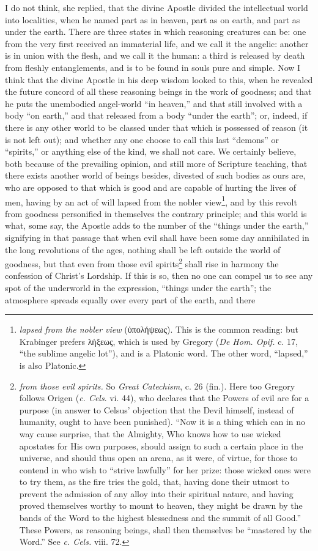 I do not think, she replied, that the divine Apostle divided the intellectual world into localities, when he named part as in heaven, part as on earth, and part as under the earth. There are three states in which reasoning creatures can be: one from the very first received an immaterial life, and we call it the angelic: another is in union with the flesh, and we call it the human: a third is released by death from fleshly entanglements, and is to be found in souls pure and simple. Now I think that the divine Apostle in his deep wisdom looked to this, when he revealed the future concord of all these reasoning beings in the work of goodness; and that he puts the unembodied angel-world “in heaven,” and that still involved with a body “on earth,” and that released from a body “under the earth”; or, indeed, if there is any other world to be classed under that which is possessed of reason (it is not left out); and whether any one choose to call this last “demons” or “spirits,” or anything else of the kind, we shall not care. We certainly believe, both because of the prevailing opinion, and still more of Scripture teaching, that there exists another world of beings besides, divested of such bodies as ours are, who are opposed to that which is good and are capable of hurting the lives of men, having by an act of will lapsed from the nobler view\footnote{\emph{lapsed from the nobler view} (\textgreek{ὑπολήψεως}). This is the common reading: but Krabinger prefers \textgreek{λήξεως}, which is used by Gregory (\emph{De Hom. Opif.} c. 17, “the sublime angelic lot”), and is a Platonic word. The other word, “lapsed,” is also Platonic.}, and by this revolt from goodness personified in themselves the contrary principle; and this world is what, some say, the Apostle adds to the number of the “things under the earth,” signifying in that passage that when evil shall have been some day annihilated in the long revolutions of the ages, nothing shall be left outside the world of goodness, but that even from those evil spirits\footnote{\emph{from those evil spirits.} So \emph{Great Catechism}, c. 26 (fin.). Here too Gregory follows Origen (\emph{c. Cels}. vi. 44), who declares that the Powers of evil are for a purpose (in answer to Celsus’ objection that the Devil himself, instead of humanity, ought to have been punished). “Now it is a thing which can in no way cause surprise, that the Almighty, Who knows how to use wicked apostates for His own purposes, should assign to such a certain place in the universe, and should thus open an arena, as it were, of virtue, for those to contend in who wish to “strive lawfully” for her prize: those wicked ones were to try them, as the fire tries the gold, that, having done their utmost to prevent the admission of any alloy into their spiritual nature, and having proved themselves worthy to mount to heaven, they might be drawn by the bands of the Word to the highest blessedness and the summit of all Good.” These Powers, as reasoning beings, shall then themselves be “mastered by the Word.” See \emph{c. Cels.} viii. 72.} shall rise in harmony the confession of Christ’s Lordship. If this is so, then no one can compel us to see any spot of the underworld in the expression, “things under the earth”; the atmosphere spreads equally over every part of the earth, and there 